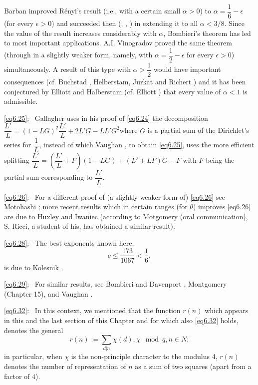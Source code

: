 \begin{enumerate}[{\bf 1.:}]
Barban \cite{key2} improved R\'enyi's result (i,e., with a certain small
$\alpha > 0$) to $\alpha =\dfrac{1}{6}-\epsilon$ (for every $\epsilon > 0$) and
succeeded then (\cite{key4}, \cite{key5}, \cite{key6}) in extending it
to all $\alpha < 3/8$. Since the value of the result increases considerably with
$\alpha$, Bombieri's theorem has led to most important
applications. A.I. Vinogradov \cite{key1} proved the same theorem (through
in a slightly weaker form, namely, with $\alpha =\dfrac{1}{2}-\epsilon$ for
every $\epsilon >0$) simultaneously. A result of this type with $\alpha
>\dfrac{1}{2}$ would have important consequences (cf. Buchstad \cite{key2},
Helberstam, Jurkat and Richert \cite{key1}) and it has been conjectured by
Elliott and Halberstam \cite{key2} (cf. Elliott \cite{key6}) that
every value of $\alpha <1$ is admissible.  

\eqref{eq6.25}:~ Gallagher \cite{key2} uses in his proof of \eqref{eq6.24}
the decomposition $\dfrac{L'}{L} = (1-LG)^2 \dfrac{L'}{L} + 2 L' G-LL'
G^2$\pageoriginale where $G$ is a partial sum of the Dirichlet's series for
$\dfrac{1}{L}$, instead of which Vaughan \cite{key6}, to obtain
\eqref{eq6.25}, uses the more efficient splitting $\dfrac{L'}{L} =
(\dfrac{L'}{L} + F)(1 - LG) + (L' + LF)G-F$ with $F$ being the partial sum
corresponding to $\dfrac{L'}{L}$. 

\eqref{eq6.26}:~ For a different proof of (a slightly weaker form
of) \eqref{eq6.26} see Motohashi \cite{key5}; more recent results
which in certain 
ranges (for $\theta$) improves \eqref{eq6.26} are due to Huxley and Iwaniec
\cite{key1} (according to Motgomery (oral communication), S. Ricci, a student
of his, has obtained a similar result).  

\eqref{eq6.28}:~ The best exponents known here,
\begin{equation*}
c \leq \frac{173}{1067} < \frac{1}{6}, \tag{6.70}\label{eq6.70}
\end{equation*} 
is due to Kolesnik \cite{key1}.

\eqref{eq6.29}:~ For similar results, see Bombieri and Davenport
\cite{key2}, Montgomery \cite{key5} (Chapter 15), and Vaughan
\cite{key6}.   

\eqref{eq6.32}:~ In this context, we mentioned that the function $r(n)$
which appears in this and the last section of this Chapter and for
which also \eqref{eq6.32} holds, denotes the general  
\begin{equation*}
r(n):= \sum_{d|n} \chi(d), \chi \mod q, n \in N :
\tag{6.71}\label{eq6.71} 
\end{equation*} 
in particular, when $\chi$ is the non-principle character to
the modulus 4, $r(n)$ denotes the number of representation of $n$ as a
sum of two squares (apart from a factor of $4$).  


\end{enumerate}
